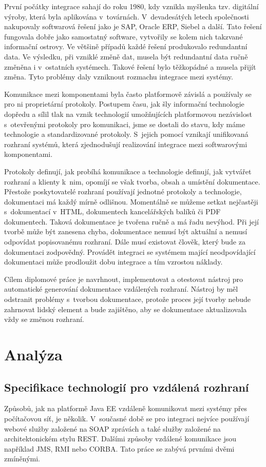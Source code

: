 \documentclass[11pt,twoside,a4paper]{book}
\begin{document}
První počátky integrace sahají do roku 1980, kdy vznikla myšlenka tzv. digitální výroby, která
byla aplikována v~továrnách. V~devadesátých letech společnosti nakupovaly softwarová řešení
jako je SAP, Oracle ERP, Siebel a další. Tato řešení fungovala dobře jako samostatný
software, vytvořily se kolem nich takzvané informační ostrovy. Ve většině případů každé
řešení produkovalo redundantní data. Ve výsledku, při vzniklé změně dat, musela
být redundantní data ručně změněna i v~ostatních systémech. Takové řešení bylo
těžkopádné a musela přijít změna. Tyto problémy daly vzniknout rozmachu integrace mezi systémy.

Komunikace mezi komponentami byla často platformově závislá a používaly se pro ni
proprietární protokoly. Postupem času, jak šly informační technologie dopředu a sílil tlak na
vznik technologií umožňujících platformovou nezávislost s~otevřenými protokoly pro
komunikaci, jsme se dostali do stavu, kdy máme technologie a standardizované
protokoly.
S~jejich pomocí vznikají unifikovaná rozhraní systémů, která zjednodušují realizování integrace mezi
softwarovými komponentami.

Protokoly definují, jak probíhá komunikace a technologie definují, jak vytvářet
rozhraní a klienty k~nim, opomíjí se však tvorba, obsah a umístění dokumentace. Přestože poskytovatelé
rozhraní používají jednotné protokoly a technologie, dokumentaci má každý mírně
odlišnou.
Momentálně se můžeme setkat nejčastěji s~dokumentací v~HTML, dokumentech
kancelářských balíků či PDF dokumentech. Taková dokumentace je tvořena ručně a má řadu
nevýhod. Při její tvorbě může být zanesena chyba, dokumentace nemusí být aktuální a nemusí
odpovídat popisovanému rozhraní. Dále musí existovat člověk, který bude za
dokumentaci zodpovědný. Provádět integraci se systémem mající neodpovídající dokumentaci může
prodloužit dobu integrace a tím vzrostou náklady.

Cílem diplomové práce je navrhnout, implementovat a otestovat nástroj pro automatické
generování dokumentace vzdálených rozhraní. Nástroj by měl odstranit problémy s~tvorbou
dokumentace, protože proces její tvorby nebude zahrnovat lidský element a bude zajištěno,
aby se dokumentace aktualizovala vždy se změnou rozhraní.

\chapter{Analýza}
\section{Specifikace technologií pro vzdálená rozhraní}
Způsobů, jak na platformě Java EE vzdáleně komunikovat mezi systémy přes
počítačovou síť, je několik. V~současné době se pro integraci nejvíce používají
webové služby založené na SOAP zprávách a také služby založené na architektonickém stylu
REST. Dalšími způsoby vzdálené komunikace jsou například JMS, RMI nebo CORBA.
Tato práce se zabývá prvními dvěmi zmíněnými.
\end{document}

